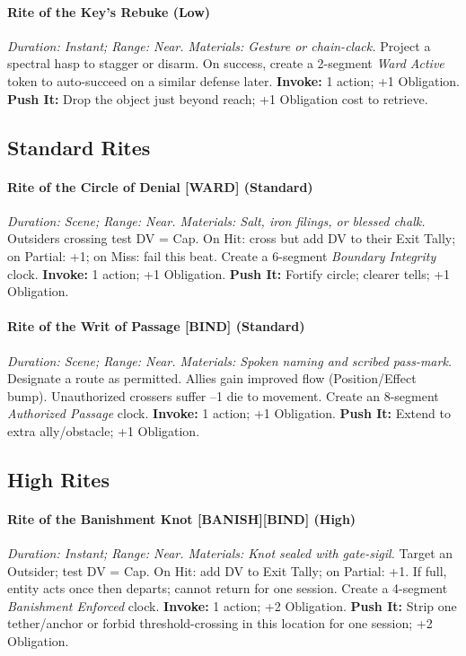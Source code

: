 \paragraph{Rite of the Key’s Rebuke (Low)}%
\emph{Duration: Instant; Range: Near. Materials: Gesture or chain-clack.}  
Project a spectral hasp to stagger or disarm. On success, create a 2-segment \emph{Ward Active} token to auto-succeed on a similar defense later.  
\textbf{Invoke:} 1 action; +1 Obligation.  
\textbf{Push It:} Drop the object just beyond reach; +1 Obligation cost to retrieve.

\subsection*{Standard Rites}
\paragraph{Rite of the Circle of Denial [WARD] (Standard)}%
\emph{Duration: Scene; Range: Near. Materials: Salt, iron filings, or blessed chalk.}  
Outsiders crossing test DV = Cap. On Hit: cross but add DV to their Exit Tally; on Partial: +1; on Miss: fail this beat. Create a 6-segment \emph{Boundary Integrity} clock.  
\textbf{Invoke:} 1 action; +1 Obligation.  
\textbf{Push It:} Fortify circle; clearer tells; +1 Obligation.

\paragraph{Rite of the Writ of Passage [BIND] (Standard)}%
\emph{Duration: Scene; Range: Near. Materials: Spoken naming and scribed pass-mark.}  
Designate a route as permitted. Allies gain improved flow (Position/Effect bump). Unauthorized crossers suffer --1 die to movement. Create an 8-segment \emph{Authorized Passage} clock.  
\textbf{Invoke:} 1 action; +1 Obligation.  
\textbf{Push It:} Extend to extra ally/obstacle; +1 Obligation.

\subsection*{High Rites}
\paragraph{Rite of the Banishment Knot [BANISH][BIND] (High)}%
\emph{Duration: Instant; Range: Near. Materials: Knot sealed with gate-sigil.}  
Target an Outsider; test DV = Cap. On Hit: add DV to Exit Tally; on Partial: +1. If full, entity acts once then departs; cannot return for one session. Create a 4-segment \emph{Banishment Enforced} clock.  
\textbf{Invoke:} 1 action; +2 Obligation.  
\textbf{Push It:} Strip one tether/anchor or forbid threshold-crossing in this location for one session; +2 Obligation.

